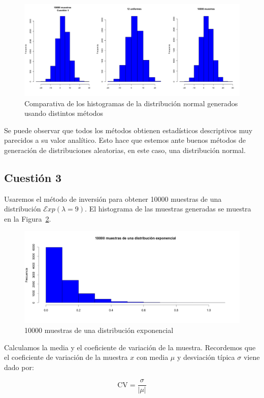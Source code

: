 \documentclass[12pt,a4paper,twoside,openright,titlepage,final]{article}
\begin{document}
\begin{figure}[htbp!]
\centering
\includegraphics[width=0.8\linewidth]{imagenes/compPlots}
\caption{Comparativa de los histogramas de la distribución normal generados usando distintos métodos}
\label{fig:compPlots}
\end{figure}

Se puede observar que todos los métodos obtienen estadísticos descriptivos muy parecidos a su valor analítico. Esto hace que estemos ante buenos métodos de generación de distribuciones aleatorias, en este caso, una distribución normal.  

\subsection{Cuestión 3}

Usaremos el método de inversión para obtener 10000 muestras de una distribución $\mathcal{E}xp(\lambda = 9)$. El histograma de las muestras generadas se muestra en la Figura~\ref{fig:distExp}.\\

\begin{figure}[htbp!]
\centering
\includegraphics[width=0.8\linewidth]{imagenes/distExp}
\caption{10000 muestras de una distribución exponencial}
\label{fig:distExp}
\end{figure}

Calculamos la media y el coeficiente de variación de la muestra. Recordemos que el coeficiente de variación de la muestra $x$ con media $\mu$ y desviación típica $\sigma$ viene dado por:

\[ \text{CV} = \dfrac{\sigma}{|\mu|} \]
\end{document}
